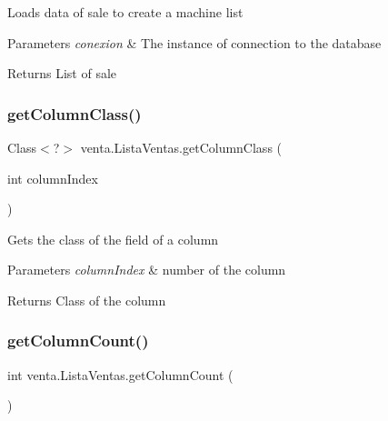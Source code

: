 Loads data of sale to create a machine list 
\begin{DoxyParams}{Parameters}
{\em conexion} & The instance of connection to the database \\
\hline
\end{DoxyParams}
\begin{DoxyReturn}{Returns}
List of sale 
\end{DoxyReturn}
\mbox{\label{classventa_1_1_lista_ventas_a285fad7c683f620c9320ee9d430975bd}} 
\subsubsection{\texorpdfstring{get\+Column\+Class()}{getColumnClass()}}
{\footnotesize\ttfamily Class$<$?$>$ venta.\+Lista\+Ventas.\+get\+Column\+Class (\begin{DoxyParamCaption}\item[{int}]{column\+Index }\end{DoxyParamCaption})\hspace{0.3cm}{\ttfamily [inline]}}

Gets the class of the field of a column 
\begin{DoxyParams}{Parameters}
{\em column\+Index} & number of the column \\
\hline
\end{DoxyParams}
\begin{DoxyReturn}{Returns}
Class of the column 
\end{DoxyReturn}
\mbox{\label{classventa_1_1_lista_ventas_a4c846805ce96ed90b2dc1228a2fc82c7}} 
\subsubsection{\texorpdfstring{get\+Column\+Count()}{getColumnCount()}}
{\footnotesize\ttfamily int venta.\+Lista\+Ventas.\+get\+Column\+Count (\begin{DoxyParamCaption}{ }\end{DoxyParamCaption})\hspace{0.3cm}{\ttfamily [inline]}}

